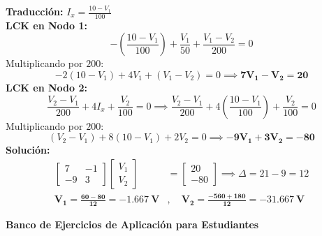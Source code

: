 \documentclass[11pt, a4paper]{article}
\begin{document}
\textbf{Traducción:} \quad $I_x = \frac{10 - V_1}{100}$ \\
\textbf{LCK en Nodo 1:}
\begin{equation*}
    -\left( \frac{10 - V_1}{100} \right) + \frac{V_1}{50} + \frac{V_1 - V_2}{200} = 0
\end{equation*}
Multiplicando por $200$:
\begin{equation*}
    -2(10 - V_1) + 4V_1 + (V_1 - V_2) = 0 \implies \mathbf{7V_1 - V_2 = 20}
\end{equation*}
\textbf{LCK en Nodo 2:}
\begin{equation*}
    \frac{V_2 - V_1}{200} + 4 I_x + \frac{V_2}{100} = 0 \implies \frac{V_2 - V_1}{200} + 4 \left( \frac{10 - V_1}{100} \right) + \frac{V_2}{100} = 0
\end{equation*}
Multiplicando por $200$:
\begin{equation*}
    (V_2 - V_1) + 8(10 - V_1) + 2V_2 = 0 \implies \mathbf{-9V_1 + 3V_2 = -80}
\end{equation*}
\textbf{Solución:}
\begin{align*}
    \begin{bmatrix} 7 & -1 \\ -9 & 3 \end{bmatrix} \begin{bmatrix} V_1 \\ V_2 \end{bmatrix} &= \begin{bmatrix} 20 \\ -80 \end{bmatrix} \implies \Delta = 21 - 9 = 12 \\
    \mathbf{V_1 = \frac{60 - 80}{12} = \qty{-1.667}{\volt}}&, \quad \mathbf{V_2 = \frac{-560 + 180}{12} = \qty{-31.667}{\volt}}
\end{align*}

\newpage
\begin{center}
    {\LARGE \textbf{Banco de Ejercicios de Aplicación para Estudiantes}}
\end{center}
\vspace{0.3cm}
\end{document}
